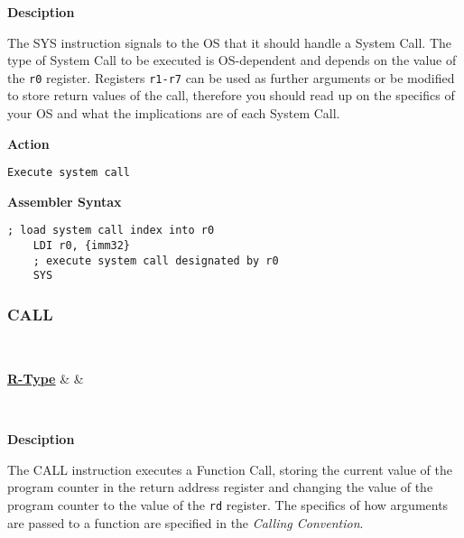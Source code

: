 \textbf{Desciption}

The SYS instruction signals to the OS that it should handle a System Call.
The type of System Call to be executed is OS-dependent and depends on the value of the \texttt{r0} register.
Registers \texttt{r1-r7} can be used as further arguments or be modified to store return values of the call, therefore you should read up on the specifics of your OS and what the implications are of each System Call.

\vspace{3ex}

\textbf{Action}
\begin{lstlisting}[frame=single]
	Execute system call
\end{lstlisting}

\vspace{3ex}

\textbf{Assembler Syntax}
\begin{lstlisting}[frame=single]
	; load system call index into r0
	LDI r0, {imm32}
	; execute system call designated by r0
	SYS
\end{lstlisting}

\subsubsection{CALL }\label{sec:CALL}

\vspace{3ex}

\begin{center}
	\begin{bytefield}[leftcurly=., leftcurlyspace=0pt]{32}
		 \\
		\begin{leftwordgroup}{\hyperref[sec:r-type]{\textbf{R-Type}}}
		 & 
		 &
		\end{leftwordgroup}\\
	\end{bytefield}
\end{center}

\textbf{Desciption}

The CALL instruction executes a Function Call, storing the current value of the program counter in the return address register and changing the value of the program counter to the value of the \texttt{rd} register.
The specifics of how arguments are passed to a function are specified in the \textit{Calling Convention}.

